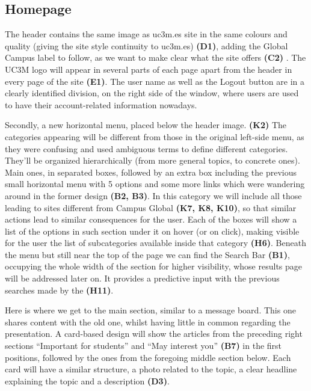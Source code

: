 \documentclass{article}
\begin{document}
\subsection{Homepage}
The header contains the same image as uc3m.es site in the same colours and quality (giving the site style continuity to uc3m.es) \textbf{(D1)}, adding the Global Campus label to follow, as we want to make clear what the site offers \textbf{(C2)} . The UC3M logo will appear in several parts of each page apart from the header in every page of the site \textbf{(E1)}. The user name as well as the Logout button are in a clearly identified division, on the right side of the window, where users are used to have their account-related information nowadays. 

Secondly, a new horizontal menu, placed below the header image. \textbf{(K2)} The categories appearing will be different from those in the original left-side menu, as they were confusing and used ambiguous terms to define different categories. They’ll be organized hierarchically (from more general topics, to concrete ones). Main ones, in separated boxes, followed by an extra box including the previous small horizontal menu with 5 options and some more links which were wandering around in the former design \textbf{(B2, B3)}. In this category we will include all those leading to sites different from Campus Global \textbf{(K7, K8, K10)}, so that similar actions lead to similar consequences for the user. Each of the boxes will show a list of the options in such section under it on hover (or on click), making visible for the user the list of subcategories available inside that category \textbf{(H6)}. 
Beneath the menu but still near the top of the page we can find the Search Bar \textbf{(B1)}, occupying the whole width of the section for higher visibility, whose results page will be addressed later on. It provides a predictive input with the previous searches made by the \textbf{(H11)}.

Here is where we get to the main section, similar to a message board. This one shares content with the old one, whilst having little in common regarding the presentation. A card-based design will show the articles from the preceding right sections “Important for students” and “May interest you” \textbf{(B7)}  in the first positions, followed by the ones from the foregoing middle section below. Each card will have a similar structure, a photo related to the topic, a clear headline explaining the topic and a description \textbf{(D3)}.
\end{document}
